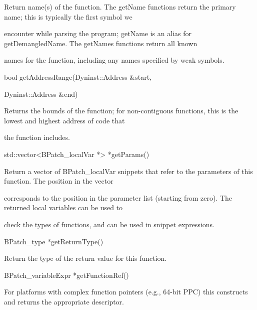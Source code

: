 {

Return name(s) of the function. The getName functions return the primary name; this is typically the first symbol we

encounter while parsing the program; getName is an alias for getDemangledName. The getNames functions return all known

names for the function, including any names specified by weak symbols.



{

bool getAddressRange(Dyninst::Address &start,}



{

Dyninst::Address &end)}



{

Returns the bounds of the function; for non-contiguous functions, this is the lowest and highest address of code that

the function includes.}





\bigskip



{

std::vector<BPatch_localVar *> *getParams()}



{

Return a vector of BPatch_localVar snippets that refer to the parameters of this function. The position in the vector

corresponds to the position in the parameter list (starting from zero). The returned local variables can be used to

check the types of functions, and can be used in snippet expressions.}



{

BPatch_type *getReturnType()}



{

Return the type of the return value for this function.}



{

BPatch_variableExpr *getFunctionRef()}



{

For platforms with complex function pointers (e.g., 64-bit PPC) this constructs and returns the appropriate descriptor.}



}
